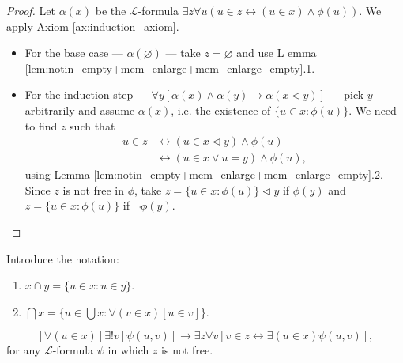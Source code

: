 \begin{proof}
    \leanok
    Let $\alpha (x)$ be the $\mathcal{L}$-formula 
    $\exists z \forall u (u\in z \leftrightarrow (u \in x) \land \phi (u))$.
    We apply Axiom \ref{ax:induction_axiom}.
    \begin{itemize}
        \item For the base case — $\alpha (\varnothing)$ — take $z=\varnothing$ and use L
        emma \ref{lem:notin_empty+mem_enlarge+mem_enlarge_empty}.1.
        \item For the induction step 
        — $\forall y[\alpha(x) \land \alpha(y) \rightarrow \alpha(x \lhd y)]$ — 
        pick $y$ arbitrarily and assume $\alpha(x)$, i.e. 
        the existence of $ \{u \in x : \phi (u)\}$. We need to find $z$ such that
    \begin{equation*}
    \begin{split}
        u \in z & \leftrightarrow (u \in x \lhd y) \land \phi (u)\\
        & \leftrightarrow (u \in x \lor u = y) \land \phi (u),
    \end{split}
    \end{equation*}
    using Lemma \ref{lem:notin_empty+mem_enlarge+mem_enlarge_empty}.2.
    Since $z$ is not free in $\phi$, take $z = \{u \in x : \phi (u)\} \lhd y$ if $\phi(y)$ 
    and $z=\{u \in x : \phi (u)\}$ if $\neg \phi(y)$.
    \end{itemize}
\end{proof}

\begin{definition}[Intersection]
    \label{def:inter+sInter}
    \leanok
    Introduce the notation:
    \begin{enumerate}
        \item $x \cap y = \{u \in x : u \in y\}$.
        \item $\bigcap x = \{u \in \bigcup x : \forall (v \in x)[u \in v] \}$.
    \end{enumerate}  
\end{definition}

\begin{theorem}
    \label{thm:repl_scheme}
    $$[\forall (u \in x) [\exists! v] \psi (u,v)]\rightarrow 
    \exists z \forall v [v\in z \leftrightarrow \exists(u \in x) \psi (u,v)],$$ 
    for any $\mathcal{L}$-formula $\psi$ in which $z$ is not free.
\end{theorem}

